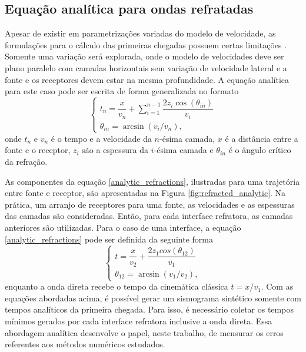 \subsection{Equação analítica para ondas refratadas}

Apesar de existir em parametrizações variadas do modelo de velocidade, as formulações para o cálculo das primeiras chegadas possuem certas limitações \cite{kearey2002introduction}. Somente uma variação será explorada, onde o modelo de velocidades deve ser plano paralelo com camadas horizontais sem variação de velocidade lateral e a fonte e os receptores devem estar na mesma profundidade. A equação analítica para este caso pode ser escrita de forma generalizada no formato 
\begin{equation}
	\begin{cases}
		t_n = \dfrac{x}{v_n} + \displaystyle\sum_{i=1}^{n-1} \dfrac{2z_i \cos(\theta_{in})}{v_i}\\
		\theta_{in} = \arcsin(v_i / v_n),
	\end{cases}
	\label{analytic_refractions}
\end{equation}
\noindent onde $t_n$ e $v_n$ é o tempo e a velocidade da $n$-ésima camada, $x$ é a distância entre a fonte e o receptor, $z_i$ são a espessura da $i$-ésima camada e $\theta_{in}$ é o ângulo crítico da refração. 

As componentes da equação \ref{analytic_refractions}, ilustradas para uma trajetória entre fonte e receptor, são apresentadas na Figura \ref{fig:refracted_analytic}. Na prática, um arranjo de receptores para uma fonte, as velocidades e as espessuras das camadas são consideradas. Então, para cada interface refratora, as camadas anteriores são utilizadas. Para o caso de uma interface, a equação \ref{analytic_refractions} pode ser definida da seguinte forma 
\begin{equation}
	\begin{cases}
		t = \dfrac{x}{v_2} + \dfrac{2z_1cos(\theta_{12})}{v_1}\\
		\theta_{12} = \arcsin(v_1 / v_2),
	\end{cases}
	\label{analytic_one_layer_case}
\end{equation}    
\noindent enquanto a onda direta recebe o tempo da cinemática clássica $t = x / v_1$. Com as equações abordadas acima, é possível gerar um sismograma sintético somente com tempos analíticos da primeira chegada. Para isso, é necessário coletar os tempos mínimos gerados por cada interface refratora inclusive a onda direta. Essa abordagem analítica desenvolve o papel, neste trabalho, de mensurar os erros referentes aos métodos numéricos estudados.

